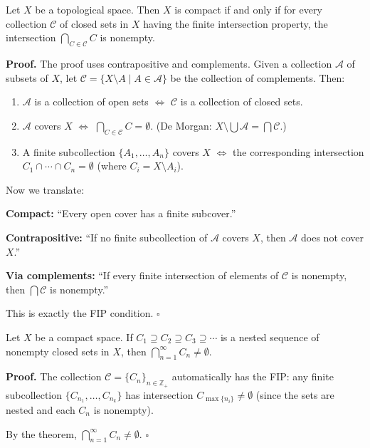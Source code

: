 \documentclass[11pt]{report}
\renewenvironment{proof}[1][Proof]{\noindent\textbf{#1.} }{\hfill$\square$\par\vspace{5pt}}
\begin{document}
\begin{thmbox}
Let $X$ be a topological space. Then $X$ is compact if and only if for every collection $\mathcal{C}$ of closed sets in $X$ having the finite intersection property, the intersection $\bigcap_{C \in \mathcal{C}} C$ is nonempty.
\end{thmbox}

\begin{proof}
The proof uses contrapositive and complements. Given a collection $\mathcal{A}$ of subsets of $X$, let $\mathcal{C} = \{X \setminus A \mid A \in \mathcal{A}\}$ be the collection of complements. Then:
\begin{enumerate}
    \item $\mathcal{A}$ is a collection of open sets $\Longleftrightarrow$ $\mathcal{C}$ is a collection of closed sets.
    \item $\mathcal{A}$ covers $X$ $\Longleftrightarrow$ $\bigcap_{C \in \mathcal{C}} C = \emptyset$. (De Morgan: $X \setminus \bigcup \mathcal{A} = \bigcap \mathcal{C}$.)
    \item A finite subcollection $\{A_1, \ldots, A_n\}$ covers $X$ $\Longleftrightarrow$ the corresponding intersection $C_1 \cap \cdots \cap C_n = \emptyset$ (where $C_i = X \setminus A_i$).
\end{enumerate}

Now we translate:

\textbf{Compact:} ``Every open cover has a finite subcover.''

\textbf{Contrapositive:} ``If no finite subcollection of $\mathcal{A}$ covers $X$, then $\mathcal{A}$ does not cover $X$.''

\textbf{Via complements:} ``If every finite intersection of elements of $\mathcal{C}$ is nonempty, then $\bigcap \mathcal{C}$ is nonempty.''

This is exactly the FIP condition.
\end{proof}

\begin{corbox}
Let $X$ be a compact space. If $C_1 \supseteq C_2 \supseteq C_3 \supseteq \cdots$ is a nested sequence of nonempty closed sets in $X$, then $\bigcap_{n=1}^{\infty} C_n \neq \emptyset$.
\end{corbox}

\begin{proof}
The collection $\mathcal{C} = \{C_n\}_{n \in \mathbb{Z}_+}$ automatically has the FIP: any finite subcollection $\{C_{n_1}, \ldots, C_{n_k}\}$ has intersection $C_{\max\{n_i\}} \neq \emptyset$ (since the sets are nested and each $C_n$ is nonempty).

By the theorem, $\bigcap_{n=1}^{\infty} C_n \neq \emptyset$.
\end{proof}
\end{document}
